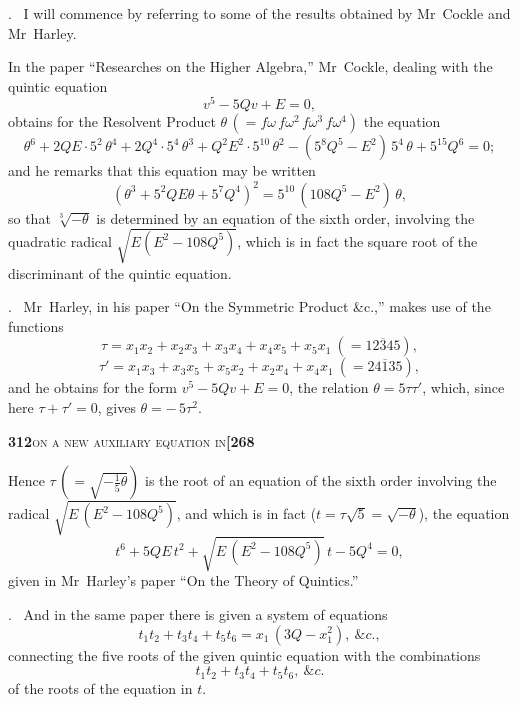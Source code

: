 \documentclass[11pt]{article}
\begin{document}
\medskip

. \ I will commence by referring to some of the results obtained by Mr~Cockle and Mr~Harley.

\medskip

\noindent In the paper ``Researches on the Higher Algebra,'' Mr~Cockle, dealing with the quintic equation
\[
   v^5 - 5 Q v + E = 0,
\]
obtains for the Resolvent Product $\theta\,(= f\omega\,f\omega^2\,f\omega^3\,f\omega^4)$ the equation
\[
   \theta^6 + 2 Q E\cdot 5^2\,\theta^4 + 2 Q^4\cdot 5^4\,\theta^3 + Q^2 E^2\cdot 5^{10}\,\theta^2 - (5^8 Q^5 - E^2)\,5^4\,\theta + 5^{15} Q^6 = 0;
\]
and he remarks that this equation may be written
\[
   (\theta^3 + 5^2 Q E\theta + 5^7 Q^4)^2 = 5^{10}\,(108 Q^5 - E^2)\,\theta,
\]
so that $\sqrt[3]{-\theta}$ is determined by an equation of the sixth order, involving the quadratic radical $\sqrt{E(E^2 - 108 Q^5)}$, which is in fact the square root of the discriminant of the quintic equation.

\medskip

. \ Mr~Harley, in his paper ``On the Symmetric Product \&c.,'' makes use of the functions
\[
   \tau = x_1 x_2 + x_2 x_3 + x_3 x_4 + x_4 x_5 + x_5 x_1\ (= \overline{12345}),
\]
\[
   \tau' = x_1 x_3 + x_3 x_5 + x_5 x_2 + x_2 x_4 + x_4 x_1\ (= \overline{24135}),
\]
and he obtains for the form $v^5 - 5 Q v + E = 0$, the relation $\theta = 5\tau\tau'$, which, since here $\tau + \tau' = 0$, gives $\theta = -\,5\tau^2$.

\newpage
\setcounter{page}{312}

\noindent\textbf{312}\hfill\textsc{on a new auxiliary equation in}\hfill\textbf{[268}

\medskip

\noindent Hence $\tau\,(=\sqrt{-\tfrac{1}{5}\theta})$ is the root of an equation of the sixth order involving the radical $\sqrt{E\,(E^2 - 108 Q^5)}$, and which is in fact ($t = \tau\sqrt{5} = \sqrt{-\theta}$), the equation
\[
   t^6 + 5 Q E\,t^2 + \sqrt{E\,(E^2 - 108 Q^5)}\,t - 5 Q^4 = 0,
\]
given in Mr~Harley's paper ``On the Theory of Quintics.''

\medskip

. \ And in the same paper there is given a system of equations
\[
   t_1 t_2 + t_3 t_4 + t_5 t_6 = x_1\,(3 Q - x_1^2),\ \&c.,
\]
connecting the five roots of the given quintic equation with the combinations
\[
   t_1 t_2 + t_3 t_4 + t_5 t_6,\ \&c.
\]
of the roots of the equation in $t$.

\medskip
\end{document}
